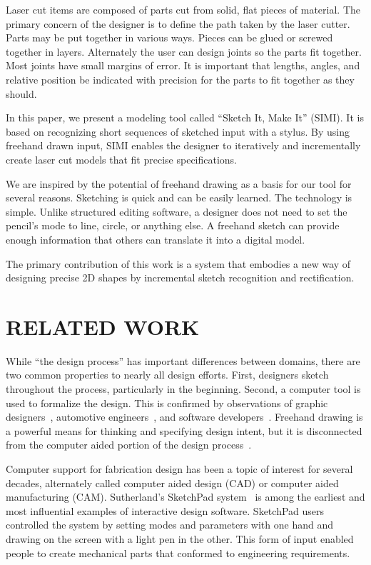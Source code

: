 \documentclass{article}
\begin{document}
Laser cut items are composed of parts cut from solid, flat pieces of
material. The primary concern of the designer is to define the path
taken by the laser cutter. Parts may be put together in various ways.
Pieces can be glued or screwed together in layers. Alternately the
user can design joints so the parts fit together. Most joints have
small margins of error. It is important that lengths, angles, and
relative position be indicated with precision for the parts to fit
together as they should.

In this paper, we present a modeling tool called ``Sketch It, Make
It'' (SIMI).  It is based on recognizing short sequences of sketched
input with a stylus. By using freehand drawn input, SIMI enables the
designer to iteratively and incrementally create laser cut models that
fit precise specifications.

We are inspired by the potential of freehand drawing as a basis for
our tool for several reasons. Sketching is quick and can be easily
learned. The technology is simple.  Unlike structured editing
software, a designer does not need to set the pencil's mode to line,
circle, or anything else. A freehand sketch can provide enough
information that others can translate it into a digital model. 

The primary contribution of this work is a system that embodies a new
way of designing precise 2D shapes by incremental sketch recognition
and rectification.

\section{RELATED WORK}

While ``the design process'' has important differences between
domains, there are two common properties to nearly all design
efforts. First, designers sketch throughout the process, particularly
in the beginning. Second, a computer tool is used to formalize the
design. This is confirmed by observations of graphic
designers~\cite{wong-rr-prototypes}, automotive
engineers~\cite{kara-styling}, and software
developers~\cite{dekel-improvised-notation}. Freehand drawing is a
powerful means for thinking and specifying design intent, but it is
disconnected from the computer aided portion of the design
process~\cite{company-sketching-in-engineering}. 

Computer support for fabrication design has been a topic of interest
for several decades, alternately called computer aided design (CAD) or
computer aided manufacturing (CAM). Sutherland's SketchPad
system~\cite{sutherland-sketchpad} is among the earliest and most
influential examples of interactive design software. SketchPad users
controlled the system by setting modes and parameters with one hand
and drawing on the screen with a light pen in the other. This form of
input enabled people to create mechanical parts that conformed to
engineering requirements. 
\end{document}
